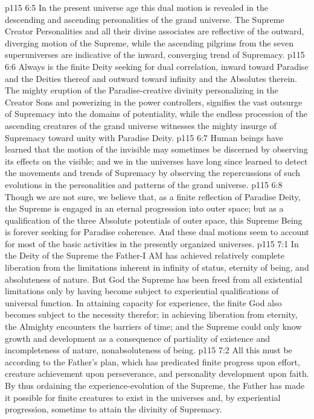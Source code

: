 \vs p115 6:5 In the present universe age this dual motion is revealed in the descending and ascending personalities of the grand universe. The Supreme Creator Personalities and all their divine associates are reflective of the outward, diverging motion of the Supreme, while the ascending pilgrims from the seven superuniverses are indicative of the inward, converging trend of Supremacy.
\vs p115 6:6 Always is the finite Deity seeking for dual correlation, inward toward Paradise and the Deities thereof and outward toward infinity and the Absolutes therein. The mighty eruption of the Paradise\hyp{}creative divinity personalizing in the Creator Sons and powerizing in the power controllers, signifies the vast outsurge of Supremacy into the domains of potentiality, while the endless procession of the ascending creatures of the grand universe witnesses the mighty insurge of Supremacy toward unity with Paradise Deity.
\vs p115 6:7 Human beings have learned that the motion of the invisible may sometimes be discerned by observing its effects on the visible; and we in the universes have long since learned to detect the movements and trends of Supremacy by observing the repercussions of such evolutions in the personalities and patterns of the grand universe.\plusone
\vs p115 6:8 Though we are not sure, we believe that, as a finite reflection of Paradise Deity, the Supreme is engaged in an eternal progression into outer space; but as a qualification of the three Absolute potentials of outer space, this Supreme Being is forever seeking for Paradise coherence. And these dual motions seem to account for most of the basic activities in the presently organized universes.
\vs p115 7:1 In the Deity of the Supreme the Father\hyp{}I AM has achieved relatively complete liberation from the limitations inherent in infinity of status, eternity of being, and absoluteness of nature. But God the Supreme has been freed from all existential limitations only by having become subject to experiential qualifications of universal function. In attaining capacity for experience, the finite God also becomes subject to the necessity therefor; in achieving liberation from eternity, the Almighty encounters the barriers of time; and the Supreme could only know growth and development as a consequence of partiality of existence and incompleteness of nature, nonabsoluteness of being.
\vs p115 7:2 All this must be according to the Father’s plan, which has predicated finite progress upon effort, creature achievement upon perseverance, and personality development upon faith. By thus ordaining the experience\hyp{}evolution of the Supreme, the Father has made it possible for finite creatures to exist in the universes and, by experiential progression, sometime to attain the divinity of Supremacy.
